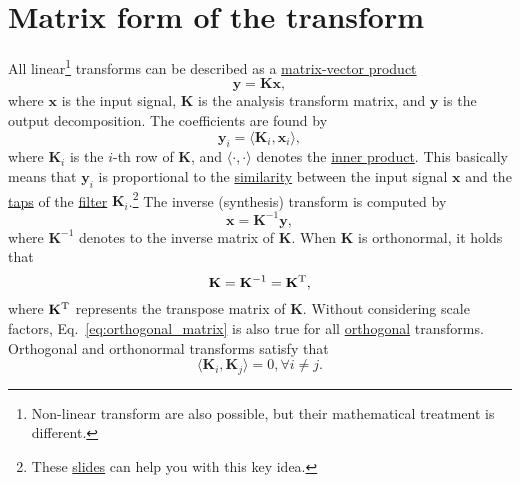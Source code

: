 
\section{Matrix form of the transform}

All linear\footnote{Non-linear transform are also possible, but their
mathematical treatment is different.} transforms can be
described as a
\href{https://en.wikipedia.org/wiki/Matrix_multiplication}{matrix-vector
  product}~\cite{strang4linear}
\begin{equation}
  \mathbf{y} = \mathbf{K}\mathbf{x},
  \label{eq:forward_transform_matrix_form}
\end{equation}
where $\mathbf{x}$ is the input signal, $\mathbf{K}$ is the analysis
transform matrix, and $\mathbf{y}$ is the output decomposition. The
coefficients are found by
\begin{equation}
  {\mathbf{y}}_i = \langle {\mathbf{K}}_i, {\mathbf{x}}_i\rangle,
\end{equation}
where ${\mathbf{K}}_i$ is the $i$-th row of $\mathbf{K}$, and
$\langle\cdot,\cdot\rangle$ denotes the
\href{https://mathworld.wolfram.com/InnerProduct.html}{inner
  product}. This basically means that ${\mathbf{y}}_i$ is proportional to the
\href{https://en.wikipedia.org/wiki/Similarity_(geometry)}{similarity}
between the input signal $\mathbf{x}$ and the
\href{https://en.wikipedia.org/wiki/Finite_impulse_response}{taps} of
the \href{https://en.wikipedia.org/wiki/Digital_filter}{filter}
${\mathbf{K}}_i$.\footnote{These
\href{https://cseweb.ucsd.edu/classes/fa17/cse166-a/lec13.pdf}{slides}
can help you with this key idea.} The inverse (synthesis) transform is
computed by
\begin{equation}
  \mathbf{x} = {\mathbf{K}}^{-1}\mathbf{y},
  \label{eq:backward_transform_matrix_form}
\end{equation}
where ${\mathbf{K}}^{-1}$ denotes to the inverse matrix of
$\mathbf{K}$. When ${\mathbf K}$ is orthonormal, it holds that
\begin{equation}
  \mathbf{K}={\mathbf{K}}^{-1}={\mathbf{K}}^{\text T},
  \label{eq:orthogonal_matrix}
\end{equation}
where ${\mathbf{K}}^{\text T}$ represents the transpose matrix of
$\mathbf{K}$. Without considering scale factors,
Eq.~\ref{eq:orthogonal_matrix} is also true for all
\href{https://en.wikipedia.org/wiki/Orthogonality}{orthogonal}
transforms. Orthogonal and orthonormal transforms satisfy that
\begin{equation}
  \langle {\mathbf{K}}_i, {\mathbf{K}}_j\rangle = 0, \forall i\neq j.
\end{equation}

